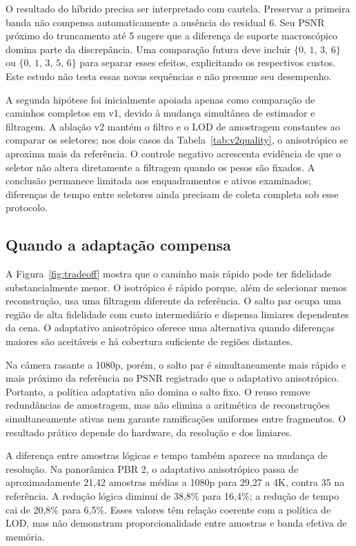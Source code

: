 O resultado do híbrido precisa ser interpretado com cautela. Preservar a primeira banda não compensa automaticamente a ausência do residual 6. Seu PSNR próximo do truncamento até 5 sugere que a diferença de suporte macroscópico domina parte da discrepância. Uma comparação futura deve incluir $\{0,\,1,\,3,\,6\}$ ou $\{0,\,1,\,3,\,5,\,6\}$ para separar esses efeitos, explicitando os respectivos custos. Este estudo não testa essas novas sequências e não presume seu desempenho.

A segunda hipótese foi inicialmente apoiada apenas como comparação de caminhos completos em v1, devido à mudança simultânea de estimador e filtragem. A ablação v2 mantém o filtro e o LOD de amostragem constantes ao comparar os seletores; nos dois casos da Tabela~\ref{tab:v2quality}, o anisotrópico se aproxima mais da referência. O controle negativo acrescenta evidência de que o seletor não altera diretamente a filtragem quando os pesos são fixados. A conclusão permanece limitada aos enquadramentos e ativos examinados; diferenças de tempo entre seletores ainda precisam de coleta completa sob esse protocolo.

\subsection{Quando a adaptação compensa}
A Figura~\ref{fig:tradeoff} mostra que o caminho mais rápido pode ter fidelidade substancialmente menor. O isotrópico é rápido porque, além de selecionar menos reconstrução, usa uma filtragem diferente da referência. O salto par ocupa uma região de alta fidelidade com custo intermediário e dispensa limiares dependentes da cena. O adaptativo anisotrópico oferece uma alternativa quando diferenças maiores são aceitáveis e há cobertura suficiente de regiões distantes.

Na câmera rasante a 1080p, porém, o salto par é simultaneamente mais rápido e mais próximo da referência no PSNR registrado que o adaptativo anisotrópico. Portanto, a política adaptativa não domina o salto fixo. O reuso remove redundâncias de amostragem, mas não elimina a aritmética de reconstruções simultaneamente ativas nem garante ramificações uniformes entre fragmentos. O resultado prático depende do hardware, da resolução e dos limiares.

A diferença entre amostras lógicas e tempo também aparece na mudança de resolução. Na panorâmica PBR 2, o adaptativo anisotrópico passa de aproximadamente 21,42 amostras médias a 1080p para 29,27 a 4K, contra 35 na referência. A redução lógica diminui de 38,8\% para 16,4\%; a redução de tempo cai de 20,8\% para 6,5\%. Esses valores têm relação coerente com a política de LOD, mas não demonstram proporcionalidade entre amostras e banda efetiva de memória.

